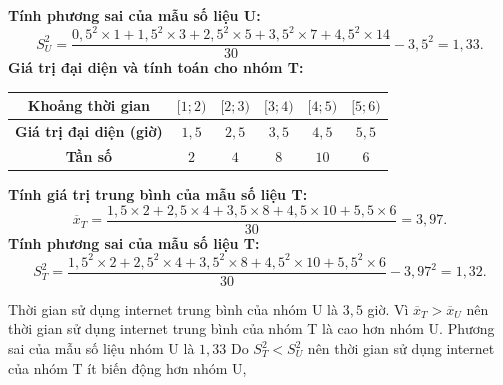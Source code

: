 \begin{ex}[Mức độ 3]
{\textbf{Tính phương sai của mẫu số liệu U:}
$$S^2_U = \frac{0{,}5^2 \times 1 + 1{,}5^2 \times 3 + 2{,}5^2 \times 5 + 3{,}5^2 \times 7 + 4{,}5^2 \times 14}{30} - 3{,}5^2 = 1{,}33.$$
\textbf{Giá trị đại diện và tính toán cho nhóm T:}
\begin{center}
\begin{tabular}{|c|c|c|c|c|c|}
\hline \textbf{Khoảng thời gian} & $[1; 2)$ & $[2; 3)$ & $[3; 4)$ & $[4; 5)$ & $[5; 6)$ \\
\hline \textbf{Giá trị đại diện (giờ)} & $1{,}5$ & $2{,}5$ & $3{,}5$ & $4{,}5$ & $5{,}5$ \\
\hline \textbf{Tần số} & $2$ & $4$ & $8$ & $10$ & $6$ \\
\hline
\end{tabular}
\end{center}
\textbf{Tính giá trị trung bình của mẫu số liệu T:}
$$\overline{x}_T = \frac{1{,}5 \times 2 + 2{,}5 \times 4 + 3{,}5 \times 8 + 4{,}5 \times 10 + 5{,}5 \times 6}{30} = 3{,}97 .$$
\textbf{Tính phương sai của mẫu số liệu T:}
$$S^2_T = \frac{1{,}5^2 \times 2 + 2{,}5^2 \times 4 + 3{,}5^2 \times 8 + 4{,}5^2 \times 10 + 5{,}5^2 \times 6}{30} - 3{,}97^2 = 1{,}32.$$
\begin{itemchoice}
\itemch Thời gian sử dụng internet trung bình của nhóm U là $3{,}5$ giờ.
\itemch Vì $\overline{x}_T>\overline{x}_U$ nên thời gian sử dụng internet trung bình của nhóm T là cao hơn nhóm U.
\itemch Phương sai của mẫu số liệu nhóm U là $1{,}33$
\itemch Do $S_T^2<S_U^2$ nên thời gian sử dụng internet của nhóm T ít biến động hơn nhóm U,
\end{itemchoice}
}
\end{ex}

